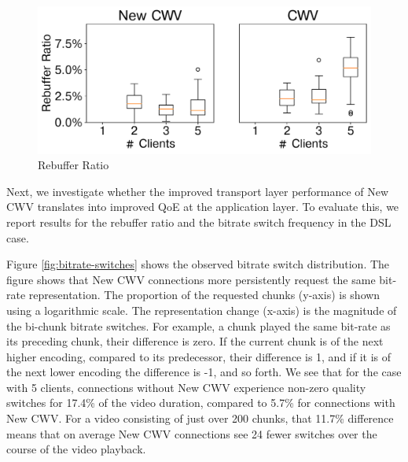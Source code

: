 \documentclass[10pt,sigconf,anonymous]{acmart}
\newcommand{\todo}[1]{\textbf{\textcolor{red}{To do: #1}}}
\begin{document}
\begin{figure}
      \includegraphics[width=.45\textwidth, keepaspectratio]{figures/Rebuffer_Ratio.pdf}
    \caption{Rebuffer Ratio}
    \label{fig:rebuffer-ratio}
\end{figure}



Next, we investigate whether the improved transport layer performance of New CWV translates into improved QoE at the application layer. To evaluate this, we report results for the rebuffer ratio and the bitrate switch frequency in the DSL case. 


Figure \ref{fig:bitrate-switches} shows the observed bitrate switch distribution. The figure shows that New CWV connections more persistently request the same bit-rate representation. The proportion of the requested chunks (y-axis) is shown using a logarithmic scale. The representation change (x-axis) is the magnitude of the bi-chunk bitrate switches. For example, a chunk played the same bit-rate as its preceding chunk, their difference is zero. If the current chunk is of the next higher encoding, compared to its predecessor, their difference is 1, and if it is of the next lower encoding the difference is -1, and so forth. We see that for the case with 5 clients, connections without New CWV experience non-zero quality switches for 17.4\% of the video duration, compared to 5.7\% for connections with New CWV. For a video consisting of just over 200 chunks, that 11.7\% difference means that on average New CWV connections see 24 fewer switches over the course of the video playback.
\end{document}
